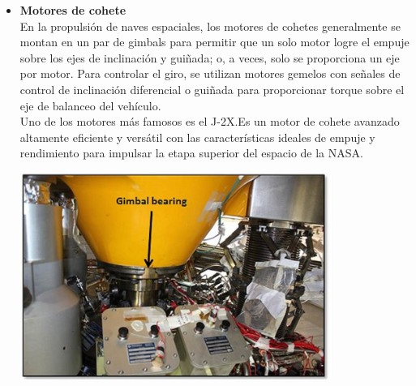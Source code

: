 \begin{itemize}
	\item \textbf{Motores de cohete}\\
	      En la propulsión de naves espaciales, los motores de cohetes generalmente se
	      montan en un par de gimbals para permitir que un solo motor logre el empuje
	      sobre los ejes de inclinación y guiñada; o, a veces, solo se proporciona un eje
	      por motor. Para controlar el giro, se utilizan motores gemelos con señales de
	      control de inclinación diferencial o guiñada para proporcionar torque sobre el
	      eje de balanceo del vehículo.\\
	      Uno de los motores más famosos es el J-2X.Es un motor de cohete avanzado altamente
	      eficiente y versátil con las características ideales de empuje y rendimiento para
	      impulsar la etapa superior del espacio de la NASA.\cite{WEB:NASA}
	      \begin{center}
		      \includegraphics[width=0.8\textwidth]{Contenido/Cuerpo/Capitulo1/Fig2.eps}
		      \label{fig:Introduccion:Fig3}
	      \end{center}


\end{itemize}
